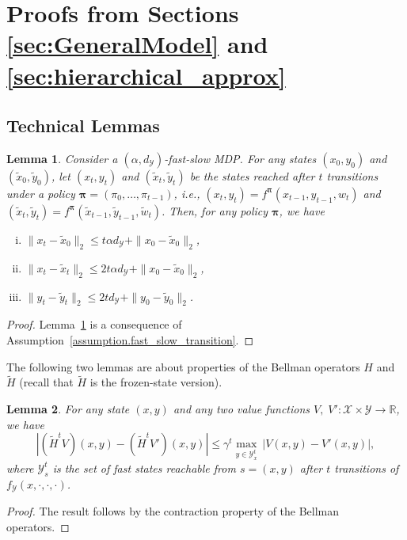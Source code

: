 \documentclass[11pt, notitlepage]{article}
\newcommand{\R}{\mathbb{R}}
\newcommand{\1}{\mathbbm{1}}
\newtheorem{lemma}{Lemma}[section]
\begin{document}
\section{Proofs from Sections \ref{sec:GeneralModel} and \ref{sec:hierarchical_approx}}
\subsection{Technical Lemmas}
\begin{lemma}
    \label{lemma:xt_yt}
Consider a $(\alpha, d_\mathcal{Y})$-fast-slow MDP. For any states $(x_0,y_0)$ and $(\tilde{x}_0,\tilde{y}_0)$, let $(x_t, y_t)$ and $(\tilde{x}_t,\tilde{y}_t)$ be the states reached after $t$ transitions under a policy $\boldsymbol{\pi} = (\pi_0,\ldots,\pi_{t-1})$, i.e., $(x_t, y_t) = f^{\boldsymbol{\pi}}(x_{t-1}, y_{t-1}, w_t)$ and $(\tilde{x}_t, \tilde{y}_t) = f^{\boldsymbol{\pi}}(\tilde{x}_{t-1}, \tilde{y}_{t-1}, \tilde{w}_t)$. Then, for any policy $\boldsymbol{\pi}$, we have
\begin{enumerate}[(i)]
    \item $\|x_t - \tilde{x}_0\|_2 \leq t \alpha  d_\mathcal{Y} + \|x_0-\tilde{x}_0\|_2$,
    \item $ \|x_t - \tilde{x}_t\|_2 \leq 2 t \alpha d_\mathcal{Y} + \|x_0-\tilde{x}_0\|_2$,
    \item  $\|y_t - \tilde{y}_t\|_2 \leq 2 t d_\mathcal{Y} + \|y_0-\tilde{y}_0\|_2$.
\end{enumerate}
\end{lemma}
\begin{proof}
    Lemma~\ref{lemma:xt_yt} is a consequence of Assumption~\ref{assumption.fast_slow_transition}.
\end{proof}


The following two lemmas are about properties of the Bellman operators $H$ and $\tilde{H}$ (recall that $\tilde{H}$ is the frozen-state version).
\begin{lemma}
    \label{lemma:HV_HV'}
    For any state $(x,y)$ and any two value functions $V, \; V': \mathcal{X}\times \mathcal{Y} \rightarrow \R$, we have
    \[
    |(\tilde{H}^t V) (x,y) - (\tilde{H}^t V') (x,y)| \leq \gamma^t \max_{y \in \mathcal Y_x^t} \, \bigl| V(x,y) - V'(x,y) \bigr|,
    \]
    where $\mathcal Y_s^t$ is the set of fast states reachable from $s=(x,y)$ after $t$ transitions of $f_\mathcal{Y}(x, \cdot, \cdot, \cdot)$.
\end{lemma}
\begin{proof}
The result follows by the contraction property of the Bellman operators.
\end{proof}
\end{document}

